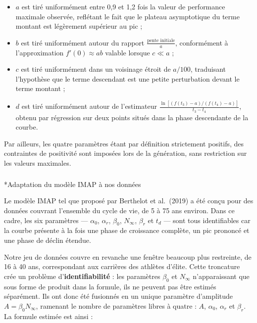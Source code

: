 \documentclass[
  french,
  11pt,
  a4paper,
]{article}
\makeatletter
\let\oldsubparagraph\subparagraph
\renewcommand{\subparagraph}{
    \@ifstar
      \xxxSubParagraphStar
      \xxxSubParagraphNoStar
  }
\newcommand{\xxxSubParagraphStar}[1]{\oldsubparagraph*{#1}\mbox{}}
\newcommand{\xxxSubParagraphNoStar}[1]{\oldsubparagraph{#1}\mbox{}}
\providecommand{\tightlist}{%
  \setlength{\itemsep}{0pt}\setlength{\parskip}{0pt}}
\makeatother
\begin{document}
\begin{itemize}
\tightlist
\item
  \textbf{\(a\)} est tiré uniformément entre 0,9 et 1,2 fois la valeur
  de performance maximale observée, reflétant le fait que le plateau
  asymptotique du terme montant est légèrement supérieur au pic ;
\item
  \textbf{\(b\)} est tiré uniformément autour du rapport
  \(\frac{\text{pente initiale}}{a}\), conformément à l'approximation
  \(f'(0) \approx ab\) valable lorsque \(c \ll a\) ;
\item
  \textbf{\(c\)} est tiré uniformément dans un voisinage étroit de
  \(a/100\), traduisant l'hypothèse que le terme descendant est une
  petite perturbation devant le terme montant ;
\item
  \textbf{\(d\)} est tiré uniformément autour de l'estimateur
  \(\frac{\ln[(f(t_3) - a) / (f(t_4) - a)]}{t_3 - t_4}\), obtenu par
  régression sur deux points situés dans la phase descendante de la
  courbe.
\end{itemize}

Par ailleurs, les quatre paramètres étant par définition strictement
positifs, des contraintes de positivité sont imposées lors de la
génération, sans restriction sur les valeurs maximales.

\subparagraph*{Adaptation du modèle IMAP à nos
données}\label{adaptation-du-moduxe8le-imap-uxe0-nos-donnuxe9es}

Le modèle IMAP tel que proposé par Berthelot et al.~(2019) a été conçu
pour des données couvrant l'ensemble du cycle de vie, de 5 à 75 ans
environ. Dans ce cadre, les six paramètres --- \(\alpha_0\),
\(\alpha_r\), \(\beta_0\), \(N_\infty\), \(\beta_r\) et \(t_d\) --- sont
tous identifiables car la courbe présente à la fois une phase de
croissance complète, un pic prononcé et une phase de déclin étendue.

Notre jeu de données couvre en revanche une fenêtre beaucoup plus
restreinte, de 16 à 40 ans, correspondant aux carrières des athlètes
d'élite. Cette troncature crée un problème d'\textbf{identifiabilité} :
les paramètres \(\beta_0\) et \(N_\infty\) n'apparaissant que sous forme
de produit dans la formule, ils ne peuvent pas être estimés séparément.
Ils ont donc été fusionnés en un unique paramètre d'amplitude
\(A = \beta_0 N_\infty\), ramenant le nombre de paramètres libres à
quatre : \(A\), \(\alpha_0\), \(\alpha_r\) et \(\beta_r\). La formule
estimée est ainsi :
\end{document}
